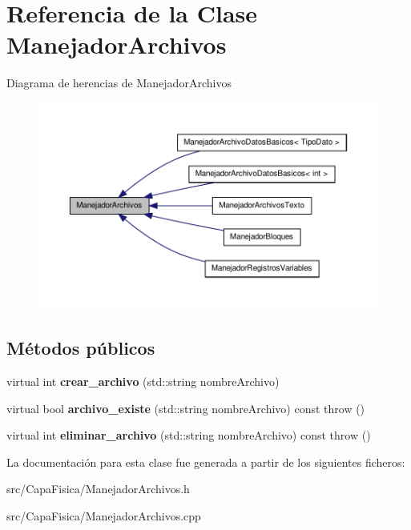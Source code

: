 \hypertarget{class_manejador_archivos}{\section{\-Referencia de la \-Clase \-Manejador\-Archivos}
\label{class_manejador_archivos}
}


\-Diagrama de herencias de \-Manejador\-Archivos
\nopagebreak
\begin{figure}[H]
\begin{center}
\leavevmode
\includegraphics[width=350pt]{class_manejador_archivos__inherit__graph}
\end{center}
\end{figure}
\subsection*{\-Métodos públicos}
\begin{DoxyCompactItemize}
\item 
\hypertarget{class_manejador_archivos_a443e54a082532a9b0a0d181712f3e12b}{virtual int {\bfseries crear\-\_\-archivo} (std\-::string nombre\-Archivo)}\label{class_manejador_archivos_a443e54a082532a9b0a0d181712f3e12b}

\item 
\hypertarget{class_manejador_archivos_ac8ce28778ecd98272ec7ec371b5b6956}{virtual bool {\bfseries archivo\-\_\-existe} (std\-::string nombre\-Archivo) const   throw ()}\label{class_manejador_archivos_ac8ce28778ecd98272ec7ec371b5b6956}

\item 
\hypertarget{class_manejador_archivos_ad0ba0fce2ad9e5fee99fa512382fa6f1}{virtual int {\bfseries eliminar\-\_\-archivo} (std\-::string nombre\-Archivo) const   throw ()}\label{class_manejador_archivos_ad0ba0fce2ad9e5fee99fa512382fa6f1}

\end{DoxyCompactItemize}


\-La documentación para esta clase fue generada a partir de los siguientes ficheros\-:\begin{DoxyCompactItemize}
\item 
src/\-Capa\-Fisica/\-Manejador\-Archivos.\-h\item 
src/\-Capa\-Fisica/\-Manejador\-Archivos.\-cpp\end{DoxyCompactItemize}
